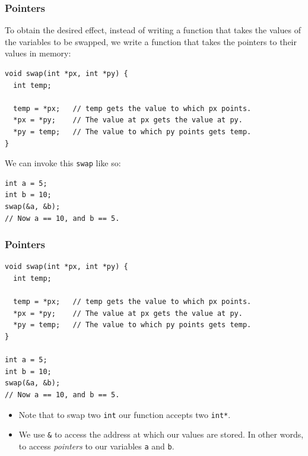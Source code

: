 \documentclass[pdf]{beamer}
\begin{document}
\begin{frame}
  \frametitle{Pointers}

  To obtain the desired effect, instead of writing a function that takes the
  values of the variables to be swapped, we write a function that takes the
  pointers to their values in memory:

\pause

\bigskip

\begin{verbatim}
void swap(int *px, int *py) {
  int temp;

  temp = *px;   // temp gets the value to which px points.
  *px = *py;    // The value at px gets the value at py.
  *py = temp;   // The value to which py points gets temp.
}
\end{verbatim}

\pause

\bigskip

We can invoke this \texttt{swap} like so:

\bigskip

\begin{verbatim}
int a = 5;
int b = 10;
swap(&a, &b);
// Now a == 10, and b == 5.
\end{verbatim}
\end{frame}

\begin{frame}[fragile]
  \frametitle{Pointers}

\begin{verbatim}
void swap(int *px, int *py) {
  int temp;

  temp = *px;   // temp gets the value to which px points.
  *px = *py;    // The value at px gets the value at py.
  *py = temp;   // The value to which py points gets temp.
}

int a = 5;
int b = 10;
swap(&a, &b);
// Now a == 10, and b == 5.
\end{verbatim}

  \begin{itemize}
  \item Note that to swap two \texttt{int} our function accepts two
    \texttt{int*}. \pause
  \item We use \texttt{&} to access the address at which our
    values are stored. In other words, to access \textit{pointers} to our
    variables \texttt{a} and \texttt{b}.
  \end{itemize}

\end{frame}
\end{document}
